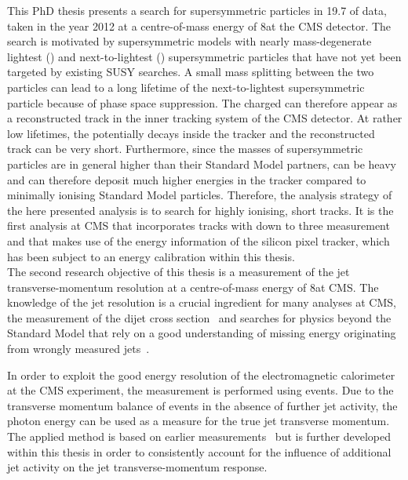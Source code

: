 This PhD thesis presents a search for supersymmetric particles in 19.7 \fbinv of data, taken in the year 2012 at a centre-of-mass energy of 8\tev at the CMS detector. 
The search is motivated by supersymmetric models with nearly mass-degenerate lightest (\chiO) and next-to-lightest (\chipm) supersymmetric particles that have not yet been targeted by existing SUSY searches.
A small mass splitting between the two particles can lead to a long lifetime of the next-to-lightest supersymmetric particle \chipm because of phase space suppression.
The charged \chipm can therefore appear as a reconstructed track in the inner tracking system of the CMS detector.
At rather low \chipm lifetimes, the \chipm potentially decays inside the tracker and the reconstructed track can be very short.  
Furthermore, since the masses of supersymmetric particles are in general higher than their Standard Model partners, \chipm can be heavy and can therefore deposit much higher energies in the tracker compared to minimally ionising Standard Model particles.
Therefore, the analysis strategy of the here presented analysis is to search for highly ionising, short tracks.
It is the first analysis at CMS that incorporates tracks with down to three measurement and that makes use of the energy information of the silicon pixel tracker, which has been subject to an energy calibration within this thesis.\\

The second research objective of this thesis is a measurement of the jet transverse-momentum resolution at a centre-of-mass energy of 8\tev at CMS.
The knowledge of the jet \pt resolution is a crucial ingredient for many analyses at CMS, \eg the measurement of the dijet cross section~\cite{bib:CMS:QCD_measurements} and searches for physics beyond the Standard Model that rely on a good understanding of missing energy originating from wrongly measured jets~\cite{bib:CMS:RA2_8TeV}.

In order to exploit the good energy resolution of the electromagnetic calorimeter at the CMS experiment, the measurement is performed using \GAMJET events.
Due to the transverse momentum balance of \GAMJET events in the absence of further jet activity, the photon energy can be used as a measure for the true jet transverse momentum.
The applied method is based on earlier measurements~\cite{bib:CMS:JERCPaper_2011,CMS:PAS:JETResolution_7TeV} but is further developed within this thesis in order to consistently account for the influence of additional jet activity on the jet transverse-momentum response.\\

